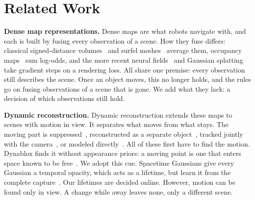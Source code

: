 \documentclass[10pt,twocolumn,letterpaper]{article}
\begin{document}

\section{Related Work}
\label{sec:related_work}

\noindent\textbf{Dense map representations.}
Dense maps are what robots navigate with, and each is built by fusing every observation of a scene. How they fuse differs: classical signed-distance volumes~\cite{10.1145/237170.237269,6162880,8202315} and surfel meshes~\cite{schops2020surfelmeshing} average them, occupancy maps~\cite{10.1007/s10514-012-9321-0,Reijgwart-RSS-23} sum log-odds, and the more recent neural fields~\cite{mildenhall2020nerf,Zhu_2022_CVPR} and Gaussian splatting~\cite{10.1145/3592433,Matsuki_2024_CVPR,Keetha_2024_CVPR} take gradient steps on a rendering loss. All share one premise: every observation still describes the scene. Once an object moves, this no longer holds, and the rules go on fusing observations of a scene that is gone. We add what they lack: a decision of which observations still hold.

\vspace{0mm}\noindent\textbf{Dynamic reconstruction.}
Dynamic reconstruction extends these maps to scenes with motion in view. It separates what moves from what stays. The moving part is suppressed~\cite{Zheng_2025_CVPR}, reconstructed as a separate object~\cite{7989518,8794371,9010932}, tracked jointly with the camera~\cite{9385844,11288097}, or modeled directly~\cite{Matsuki_2025_CVPR,Li_2025_ICCV,Li_2026_WACV,Wang_2026_CVPR,Wu_2024_CVPR_4dgs,Mazur_2026_CVPR}. All of these first have to find the motion. Dynablox finds it without appearance priors: a moving point is one that enters space known to be free~\cite{10218983}. We adopt this cue. Spacetime Gaussians give every Gaussian a temporal opacity, which acts as a lifetime, but learn it from the complete capture~\cite{Li_2024_CVPR_spacetime}. Our lifetimes are decided online. However, motion can be found only in view. A change while away leaves none, only a different scene.
\end{document}
